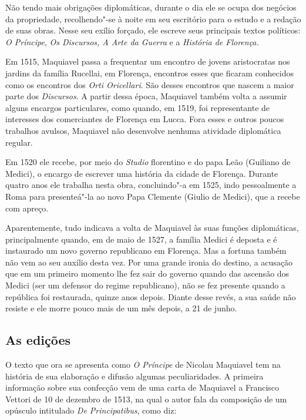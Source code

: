 Não tendo mais obrigações diplomáticas, durante o dia ele se ocupa dos
negócios da propriedade, recolhendo"-se à noite em seu escritório para o
estudo e a redação de suas obras. Nesse seu exílio forçado, ele escreve
seus principais textos políticos: \emph{O Príncipe}, \emph{Os Discursos,
A Arte da Guerra} e a \emph{História de Florença.}

Em 1515, Maquiavel passa a frequentar um encontro de jovens aristocratas
nos jardins da família Rucellai, em Florença, encontros esses que
ficaram conhecidos como os encontros dos \emph{Orti Oricellari}. São
desses encontros que nascem a maior parte dos \emph{Discursos}. A partir
dessa época, Maquiavel também volta a assumir alguns encargos
particulares, como quando, em 1519, foi representante de interesses dos
comerciantes de Florença em Lucca. Fora esses e outros poucos trabalhos
avulsos, Maquiavel não desenvolve nenhuma atividade diplomática regular.

Em 1520 ele recebe, por meio do \emph{Studio} florentino e do papa Leão
 (Guiliano de Medici), o encargo de escrever uma história da cidade de
Florença. Durante quatro anos ele trabalha nesta obra, concluindo"-a em
1525, indo pessoalmente a Roma para presenteá"-la ao novo Papa Clemente
 (Giulio de Medici), que a recebe com apreço.

Aparentemente, tudo indicava a volta de Maquiavel às suas funções
diplomáticas, principalmente quando, em de maio de 1527, a família
Medici é deposta e é instaurado um novo governo republicano em Florença.
Mas a fortuna também não vem ao seu auxílio desta vez. Por uma grande
ironia do destino, a acusação que em um primeiro momento lhe fez sair do
governo quando das ascensão dos Medici (ser um defensor do regime
republicano), não se fez presente quando a república foi restaurada,
quinze anos depois. Diante desse revés, a sua saúde não resiste e ele
morre pouco mais de um mês depois, a 21 de junho.

\subsection{As edições}

O texto que ora se apresenta como \emph{O Príncipe} de Nicolau Maquiavel
tem na história de sua elaboração e difusão algumas peculiaridades. A
primeira informação sobre sua confecção vem de uma carta de Maquiavel a
Francisco Vettori de 10 de dezembro de 1513, na qual o autor fala da
composição de um opúsculo intitulado \emph{De Principatibus}, como diz:

